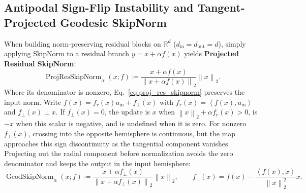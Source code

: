 \documentclass[10pt]{article}
\theoremstyle{definition}
\theoremstyle{remark}
\newcommand{\R}{\mathbb{R}}
\newcommand{\norm}[1]{\left\lVert #1 \right\rVert}
\newcommand{\inner}[1]{\left\langle #1 \right\rangle}
\begin{document}
\subsection{Antipodal Sign-Flip Instability and Tangent-Projected Geodesic SkipNorm}

When building norm-preserving residual blocks on $\R^d$ ($d_{\mathrm{in}} = d_{\mathrm{out}} = d$), simply applying SkipNorm to a residual branch $y = x + \alpha f(x)$ yields \textbf{Projected Residual SkipNorm}:
\begin{equation}
    \operatorname{ProjResSkipNorm}_\alpha(x; f) \coloneqq \frac{x + \alpha f(x)}{\norm{x + \alpha f(x)}_2} \norm{x}_2.
    \label{eq:proj_res_skipnorm}
\end{equation}
Where its denominator is nonzero, Eq.~\eqref{eq:proj_res_skipnorm} preserves the input norm. Write $f(x)=f_r(x)u_{\mathrm{in}}+f_\perp(x)$ with $f_r(x)=\inner{f(x),u_{\mathrm{in}}}$ and $f_\perp(x)\perp x$. If $f_\perp(x)=0$, the update is $x$ when $\norm x_2+\alpha f_r(x)>0$, is $-x$ when this scalar is negative, and is undefined when it is zero. For nonzero $f_\perp(x)$, crossing into the opposite hemisphere is continuous, but the map approaches this sign discontinuity as the tangential component vanishes. Projecting out the radial component before normalization avoids the zero denominator and keeps the output in the input hemisphere:
\begin{equation}
    \operatorname{GeodSkipNorm}_\alpha(x; f) \coloneqq \frac{x + \alpha f_\perp(x)}{\norm{x + \alpha f_\perp(x)}_2} \norm{x}_2, \qquad f_\perp(x) = f(x) - \frac{\inner{f(x), x}}{\norm{x}_2^2} x.
    \label{eq:geodesic_skipnorm}
\end{equation}
\end{document}

